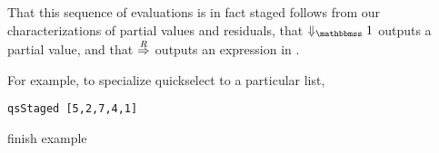 That this sequence of evaluations is in fact staged follows from our
characterizations of partial values and residuals, that $\redonesym$
outputs a partial value, and that $\overset{R}\Rightarrow$ outputs an expression in \langTwo.

For example, to specialize quickselect to a particular list, 
\begin{lstlisting}
qsStaged [5,2,7,4,1]
\end{lstlisting}
\TODO finish example

